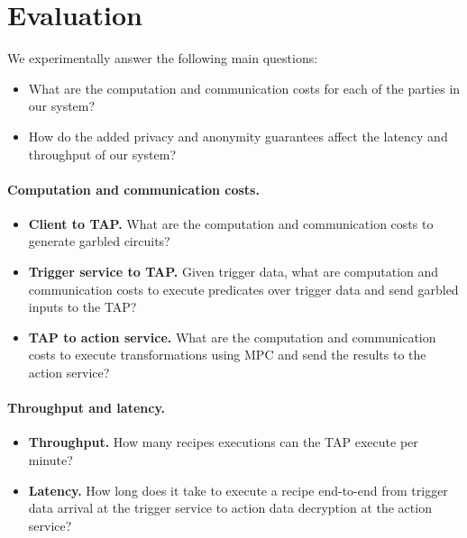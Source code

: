 \section{Evaluation}
\label{sec:evaluation}

We experimentally answer the following main questions:
\begin{itemize}
  \item What are the computation and communication costs for each of the parties
    in our system?
  \item How do the added privacy and anonymity guarantees affect the latency and
    throughput of our system?
\end{itemize}

\paragraph{Computation and communication costs.}
\begin{itemize}
  \item \textbf{Client to TAP.} What are the computation and communication costs
    to generate garbled circuits?
  \item \textbf{Trigger service to TAP.} Given trigger data, what are
    computation and communication costs to execute predicates over trigger data
    and send garbled inputs to the TAP?
  \item \textbf{TAP to action service.} What are the computation and
    communication costs to execute transformations using MPC and send the
    results to the action service?
\end{itemize}

\paragraph{Throughput and latency.}
\begin{itemize}
  \item \textbf{Throughput.} How many recipes executions can the TAP execute per
    minute?
  \item \textbf{Latency.} How long does it take to execute a recipe end-to-end
    from trigger data arrival at the trigger service to action data decryption
    at the action service?
\end{itemize}
